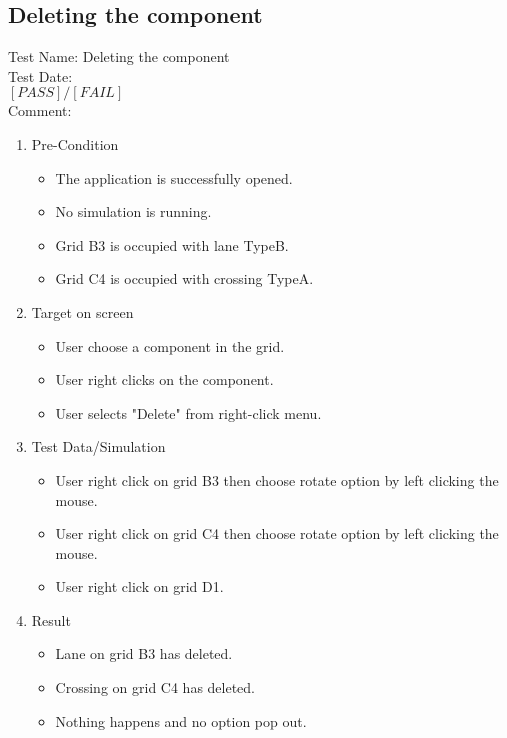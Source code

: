\subsection{Deleting the component}
Test Name: Deleting the component\\Test Date: \\ $\left[ PASS \right] / \left[ FAIL \right]$\\Comment: \\
\begin{enumerate}
	\item Pre-Condition
	\begin{itemize}
		\item The application is successfully opened.
		\item No simulation is running.
		\item Grid B3 is occupied with lane TypeB.
		\item Grid C4 is occupied with crossing TypeA.
	\end{itemize}
	\item Target on screen
	\begin{itemize}
		\item User choose a component in the grid.
		\item User right clicks on the component.
		\item User selects "Delete" from right-click menu.
	\end{itemize}
	\item Test Data/Simulation
	\begin{itemize}
		\item User right click on grid B3 then choose rotate option by left clicking the mouse. 
		\item User right click on grid C4 then choose rotate option by left clicking the mouse.
		\item User right click on grid D1. 
	\end{itemize}
	\item Result
	\begin{itemize}
		\item Lane on grid B3 has deleted.
		\item Crossing on grid C4 has deleted.
		\item Nothing happens and no option pop out.
	\end{itemize}
\end{enumerate}

\newpage

